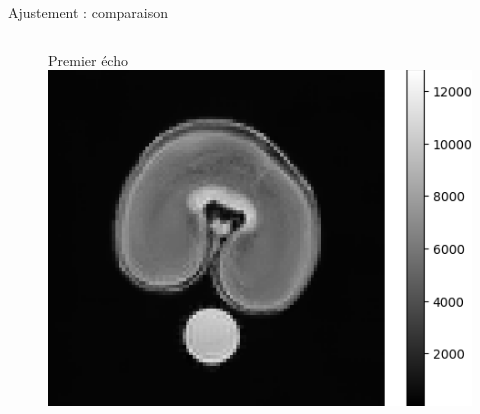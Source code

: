 \documentclass[10pt]{beamer}
\begin{document}
\begin{frame}{Ajustement : comparaison}
  \vspace{-0.4cm}
  \begin{columns}
    \begin{column}[c]{0.2\textwidth}
      \begin{figure}[ht]
        \centering
        Premier écho
        \includegraphics[width=0.9\linewidth]{fig/firstecho}
      \end{figure}
    \end{column}
    

\end{columns}
\end{frame}
\end{document}
